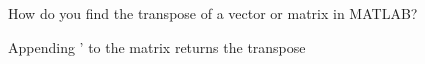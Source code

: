 How do you find the transpose of a vector or matrix in MATLAB?

\begin{solution}
Appending ' to the matrix returns the transpose
\end{solution}